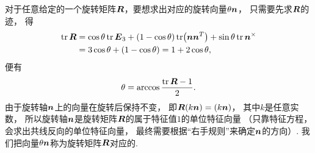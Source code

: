 对于任意给定的一个旋转矩阵\(\boldsymbol{R}\)，要想求出对应的旋转向量\(\theta \boldsymbol{n}\)，
只需要先求\(\boldsymbol{R}\)的迹，
得\begin{align*}
	\tr \boldsymbol{R}
	&= \cos\theta \tr \boldsymbol{E}_3
	+ (1 - \cos\theta) \tr(\boldsymbol{n} \boldsymbol{n}^T)
	+ \sin\theta \tr\boldsymbol{n}^\times \\
	&= 3 \cos\theta + (1 - \cos\theta)
	= 1 + 2 \cos\theta,
\end{align*}
便有\begin{equation*}
	\theta = \arccos\frac{\tr \boldsymbol{R} - 1}{2}.
\end{equation*}
由于旋转轴\(\boldsymbol{n}\)上的向量在旋转后保持不变，
即\(\boldsymbol{R} (k \boldsymbol{n}) = (k \boldsymbol{n})\)，
其中\(k\)是任意实数，
所以旋转轴\(\boldsymbol{n}\)是旋转矩阵\(\boldsymbol{R}\)的属于特征值\(1\)的单位特征向量
（只靠特征方程，会求出共线反向的单位特征向量，
最终需要根据“右手规则”来确定\(\boldsymbol{n}\)的方向）.
我们把向量\(\theta \boldsymbol{n}\)称为旋转矩阵\(\boldsymbol{R}\)对应的.
